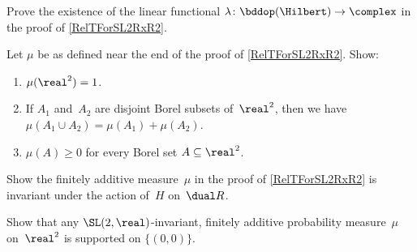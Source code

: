 \begin{exercises}

\item \label{ConstructPhiEx}
Prove the existence of the linear functional $\lambda \colon \bddop(\Hilbert) \to \complex$ in the proof of \cref{RelTForSL2RxR2}.

\item \label{MuIsFinAdd}
Let $\mu$ be as defined near the end of the proof of \cref{RelTForSL2RxR2}. Show:
	\begin{enumerate}
	\item $\mu(\real^2) = 1$.
	\item If $A_1$ and~$A_2$ are disjoint Borel subsets of~$\real^2$, then we have $\mu(A_1 \cup A_2) = \mu(A_1) + \mu(A_2)$.
	\item $\mu(A) \ge 0$ for every Borel set $A \subseteq \real^2$.
	\end{enumerate}

\item \label{muIsHInvtEx}
Show the finitely additive measure~$\mu$ in the proof of \cref{RelTForSL2RxR2} is invariant under the action of~$H$ on~$\dual R$.

\item \label{InvtMeanOnR2}
Show that any $\SL(2,\real)$-invariant, finitely additive probability measure~$\mu$ on~$\real^2$ is supported on $\{(0,0)\}$.


\end{exercises}
